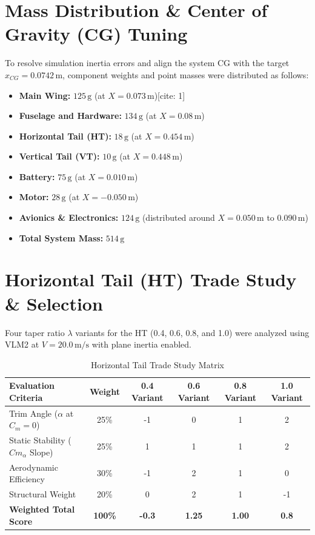 \documentclass[11pt,a4paper]{article}
\begin{document}
\section{Mass Distribution \& Center of Gravity (CG) Tuning}
To resolve simulation inertia errors and align the system CG with the target $x_{CG} = 0.0742\,\text{m}$, component weights and point masses were distributed as follows:
\begin{itemize}
    \item \textbf{Main Wing:} $125\,\text{g}$ (at $X = 0.073\,\text{m}$)[cite: 1]
    \item \textbf{Fuselage and Hardware:} $134\,\text{g}$ (at $X = 0.08\,\text{m}$)
    \item \textbf{Horizontal Tail (HT):} $18\,\text{g}$ (at $X = 0.454\,\text{m}$)
    \item \textbf{Vertical Tail (VT):} $10\,\text{g}$ (at $X = 0.448\,\text{m}$)
    \item \textbf{Battery:} $75\,\text{g}$ (at $X = 0.010\,\text{m}$)
    \item \textbf{Motor:} $28\,\text{g}$ (at $X = -0.050\,\text{m}$)
    \item \textbf{Avionics \& Electronics:} $124\,\text{g}$ (distributed around $X = 0.050\,\text{m}$ to $0.090\,\text{m}$)
    \item \textbf{Total System Mass:} $514\,\text{g}$
\end{itemize}

\section{Horizontal Tail (HT) Trade Study \& Selection}
Four taper ratio $\lambda$ variants for the HT (0.4, 0.6, 0.8, and 1.0) were analyzed using VLM2 at $V = 20.0\,\text{m/s}$ with plane inertia enabled. 

\begin{table}[H]
\centering
\caption{Horizontal Tail Trade Study Matrix}
\begin{tabular}{lccccc}
\toprule
\textbf{Evaluation Criteria} & \textbf{Weight} & \textbf{0.4 Variant} & \textbf{0.6 Variant} & \textbf{0.8 Variant} & \textbf{1.0 Variant} \\
\midrule
Trim Angle ($\alpha$ at $C_m=0$) & 25\% & -1 & 0 & 1 & 2 \\
Static Stability ($Cm_\alpha$ Slope) & 25\% & 1 & 1 & 1 & 2 \\
Aerodynamic Efficiency & 30\% & -1 & 2 & 1 & 0 \\
Structural Weight & 20\% & 0 & 2 & 1 & -1 \\
\midrule
\textbf{Weighted Total Score} & \textbf{100\%} & \textbf{-0.3} & \textbf{1.25} & \textbf{1.00} & \textbf{0.8} \\
\bottomrule
\end{tabular}
\end{table}
\end{document}
